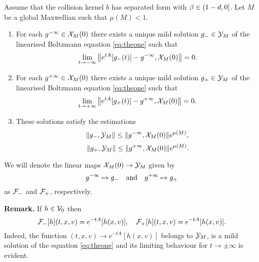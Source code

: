 \begin{theorem}
	\label{th:exists:boundary}
     Assume that the collision kernel $b$ has
separated form with $\beta\in ( 1-d ,0]$. Let $M$ be a global Maxwellian such
that $\mu(M)<1$.     \begin{enumerate}     \item \label{eit:exists:boundary}
For each ${g^{-\infty}}\in {\mathcal X_M(0)}$ there exists a unique mild solution $g_-\in {\mathcal Y_M}$
of the linearised Boltzmann equation \eqref{eq:theone} such that \[\lim_{t\to- \infty}\left\|e^{tA}[g_-(t)]-{g^{-\infty}},{\mathcal X_M(0)}\right\|=0.\]
	\item For each ${g^{+\infty}}\in {\mathcal X_M(0)}$ there exists a unique mild solution $g_+\in {\mathcal Y_M}$
of the linearised Boltzmann equation \eqref{eq:theone} such that \[\lim_{t\to+ \infty}\left\|e^{tA}[g_+(t)]-{g^{+\infty}},{\mathcal X_M(0)}\right\|=0.\]
     \item  These
solutions satisfy the estimations \[\|g_-,{\mathcal Y_M}\|\le \|{g^{-\infty}},{\mathcal X_M(0)}\|e^{ \mu (M)}, \]
\[\|g_+,{\mathcal Y_M}\|\le \|{g^{+\infty}},{\mathcal X_M(0)}\|e^{ \mu (M)} .\]
	\end{enumerate}%
%
	We will denote the linear maps ${\mathcal X_M(0)}\to {\mathcal Y_M}$ given by  \begin{equation*}
		{g^{-\infty}}\mapsto g_- \quad
		 \mbox{and}\quad  {g^{+\infty}}\mapsto g_+
	\end{equation*}  as
	  $\mathcal F_-$ and $\mathcal F_+$, respectively. 
\end{theorem}\noindent
\textbf{Remark.} If $h\in {\mathcal V_0}$ then
\[\mathcal F_{-}[h](t,x,v) = e^{-tA}[h(x,v)],\quad \mathcal F_{+}[h](t,x,v) = e^{-tA}[h(x,v)].\]
Indeed, the function $(t,x,v)\to e^{-tA}[h(x,v)]$ belongs to ${\mathcal Y_M}$, is a mild solution of the equation \eqref{eq:theone} and its limiting behaviour for $t\to\pm \infty	$ is evident.

